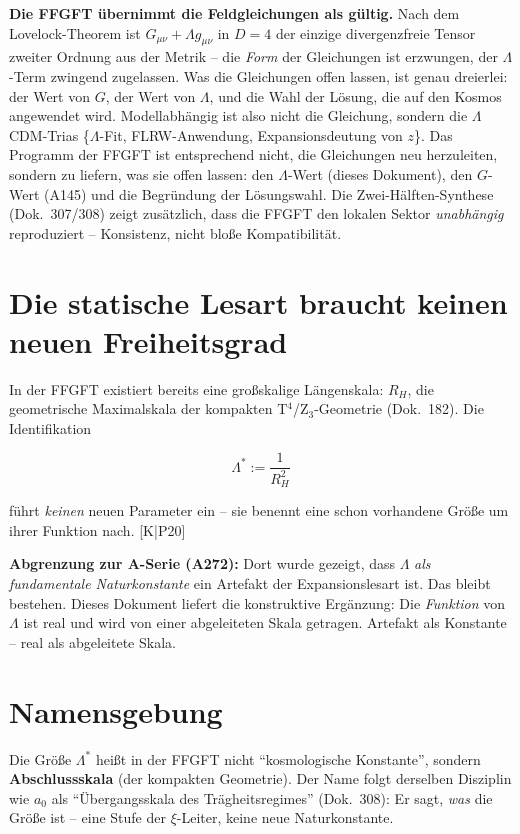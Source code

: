 \documentclass[11pt]{report}
\begin{document}
\textbf{Die FFGFT übernimmt die Feldgleichungen als gültig.} Nach dem
Lovelock-Theorem ist $G_{\mu\nu} + \Lambda g_{\mu\nu}$ in $D=4$ der
einzige divergenzfreie Tensor zweiter Ordnung aus der Metrik -- die
\emph{Form} der Gleichungen ist erzwungen, der $\Lambda$-Term
zwingend zugelassen. Was die Gleichungen offen lassen, ist genau
dreierlei: der Wert von $G$, der Wert von $\Lambda$, und die Wahl
der Lösung, die auf den Kosmos angewendet wird. Modellabhängig ist
also nicht die Gleichung, sondern die $\Lambda$CDM-Trias
\{$\Lambda$-Fit, FLRW-Anwendung, Expansionsdeutung von $z$\}.
Das Programm der FFGFT ist entsprechend nicht, die Gleichungen neu
herzuleiten, sondern zu liefern, was sie offen lassen: den
$\Lambda$-Wert (dieses Dokument), den $G$-Wert (A145) und die
Begründung der Lösungswahl. Die Zwei-Hälften-Synthese
(Dok.~307/308) zeigt zusätzlich, dass die FFGFT den lokalen Sektor
\emph{unabhängig} reproduziert -- Konsistenz, nicht bloße
Kompatibilität.

\section{Die statische Lesart braucht keinen neuen Freiheitsgrad}

In der FFGFT existiert bereits eine großskalige Längenskala:
$R_H$, die geometrische Maximalskala der kompakten
T$^4$/Z$_3$-Geometrie (Dok.~182). Die Identifikation

\begin{equation}
  \Lambda^{*} := \frac{1}{R_H^2}
  \label{eq:def}
\end{equation}

führt \emph{keinen} neuen Parameter ein -- sie benennt eine schon
vorhandene Größe um ihrer Funktion nach. [K|P20]

\textbf{Abgrenzung zur A-Serie (A272):} Dort wurde gezeigt, dass
$\Lambda$ \emph{als fundamentale Naturkonstante} ein Artefakt der
Expansionslesart ist. Das bleibt bestehen. Dieses Dokument liefert die
konstruktive Ergänzung: Die \emph{Funktion} von $\Lambda$ ist real und
wird von einer abgeleiteten Skala getragen. Artefakt als Konstante --
real als abgeleitete Skala.

\section{Namensgebung}

Die Größe $\Lambda^{*}$ heißt in der FFGFT nicht
\enquote{kosmologische Konstante}, sondern \textbf{Abschlussskala}
(der kompakten Geometrie). Der Name folgt derselben Disziplin wie
$a_0$ als \enquote{Übergangsskala des Trägheitsregimes} (Dok.~308):
Er sagt, \emph{was} die Größe ist -- eine Stufe der $\xi$-Leiter,
keine neue Naturkonstante.
\end{document}
